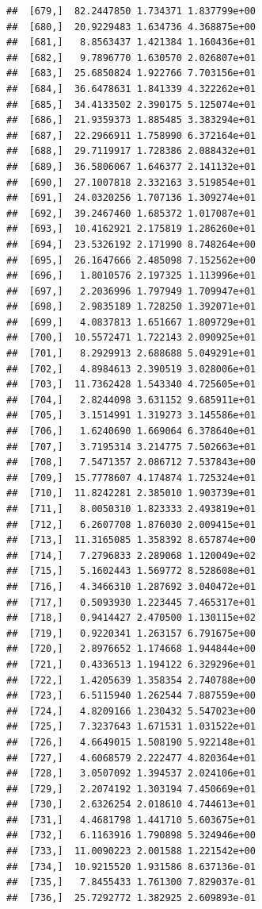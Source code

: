 \documentclass[article]{jss}\usepackage[]{graphicx}\usepackage[]{xcolor}
\makeatletter
\newenvironment{kframe}{%
 \def\at@end@of@kframe{}%
 \ifinner\ifhmode%
  \def\at@end@of@kframe{\end{minipage}}%
  \begin{minipage}{\columnwidth}%
 \fi\fi%
 \def\FrameCommand##1{\hskip\@totalleftmargin \hskip-\fboxsep
 \colorbox{shadecolor}{##1}\hskip-\fboxsep
     \hskip-\linewidth \hskip-\@totalleftmargin \hskip\columnwidth}%
 \MakeFramed {\advance\hsize-\width
   \@totalleftmargin\z@ \linewidth\hsize
   \@setminipage}}%
 {\par\unskip\endMakeFramed%
 \at@end@of@kframe}
\newenvironment{knitrout}{}{} %
\makeatother
\begin{document}
\begin{knitrout}
\begin{kframe}
\begin{verbatim}
##  [679,]  82.2447850 1.734371 1.837799e+00
##  [680,]  20.9229483 1.634736 4.368875e+00
##  [681,]   8.8563437 1.421384 1.160436e+01
##  [682,]   9.7896770 1.630570 2.026807e+01
##  [683,]  25.6850824 1.922766 7.703156e+01
##  [684,]  36.6478631 1.841339 4.322262e+01
##  [685,]  34.4133502 2.390175 5.125074e+01
##  [686,]  21.9359373 1.885485 3.383294e+01
##  [687,]  22.2966911 1.758990 6.372164e+01
##  [688,]  29.7119917 1.728386 2.088432e+01
##  [689,]  36.5806067 1.646377 2.141132e+01
##  [690,]  27.1007818 2.332163 3.519854e+01
##  [691,]  24.0320256 1.707136 1.309274e+01
##  [692,]  39.2467460 1.685372 1.017087e+01
##  [693,]  10.4162921 2.175819 1.286260e+01
##  [694,]  23.5326192 2.171990 8.748264e+00
##  [695,]  26.1647666 2.485098 7.152562e+00
##  [696,]   1.8010576 2.197325 1.113996e+01
##  [697,]   2.2036996 1.797949 1.709947e+01
##  [698,]   2.9835189 1.728250 1.392071e+01
##  [699,]   4.0837813 1.651667 1.809729e+01
##  [700,]  10.5572471 1.722143 2.090925e+01
##  [701,]   8.2929913 2.688688 5.049291e+01
##  [702,]   4.8984613 2.390519 3.028006e+01
##  [703,]  11.7362428 1.543340 4.725605e+01
##  [704,]   2.8244098 3.631152 9.685911e+01
##  [705,]   3.1514991 1.319273 3.145586e+01
##  [706,]   1.6240690 1.669064 6.378640e+01
##  [707,]   3.7195314 3.214775 7.502663e+01
##  [708,]   7.5471357 2.086712 7.537843e+00
##  [709,]  15.7778607 4.174874 1.725324e+01
##  [710,]  11.8242281 2.385010 1.903739e+01
##  [711,]   8.0050310 1.823333 2.493819e+01
##  [712,]   6.2607708 1.876030 2.009415e+01
##  [713,]  11.3165085 1.358392 8.657874e+00
##  [714,]   7.2796833 2.289068 1.120049e+02
##  [715,]   5.1602443 1.569772 8.528608e+01
##  [716,]   4.3466310 1.287692 3.040472e+01
##  [717,]   0.5093930 1.223445 7.465317e+01
##  [718,]   0.9414427 2.470500 1.130115e+02
##  [719,]   0.9220341 1.263157 6.791675e+00
##  [720,]   2.8976652 1.174668 1.944844e+00
##  [721,]   0.4336513 1.194122 6.329296e+01
##  [722,]   1.4205639 1.358354 2.740788e+00
##  [723,]   6.5115940 1.262544 7.887559e+00
##  [724,]   4.8209166 1.230432 5.547023e+00
##  [725,]   7.3237643 1.671531 1.031522e+01
##  [726,]   4.6649015 1.508190 5.922148e+01
##  [727,]   4.6068579 2.222477 4.820364e+01
##  [728,]   3.0507092 1.394537 2.024106e+01
##  [729,]   2.2074192 1.303194 7.450669e+01
##  [730,]   2.6326254 2.018610 4.744613e+01
##  [731,]   4.4681798 1.441710 5.603675e+01
##  [732,]   6.1163916 1.790898 5.324946e+00
##  [733,]  11.0090223 2.001588 1.221542e+00
##  [734,]  10.9215520 1.931586 8.637136e-01
##  [735,]   7.8455433 1.761300 7.829037e-01
##  [736,]  25.7292772 1.382925 2.609893e-01

\end{verbatim}
\end{kframe}
\end{knitrout}
\end{document}
